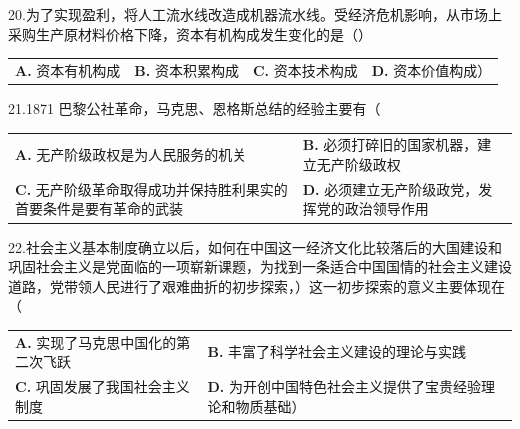 \documentclass[UTF8,11pt]{ctexart}
\begin{document}
20.为了实现盈利，将人工流水线改造成机器流水线。受经济危机影响，从市场上采购生产原材料价格下降，资本有机构成发生变化的是（）


\begin{center}\begin{tabular}{>{\raggedright\arraybackslash}p{\dimexpr(\linewidth-8\tabcolsep)/4\relax}>{\raggedright\arraybackslash}p{\dimexpr(\linewidth-8\tabcolsep)/4\relax}>{\raggedright\arraybackslash}p{\dimexpr(\linewidth-8\tabcolsep)/4\relax}>{\raggedright\arraybackslash}p{\dimexpr(\linewidth-8\tabcolsep)/4\relax}}
\textbf{A.} 资本有机构成 & \textbf{B.} 资本积累构成 & \textbf{C.} 资本技术构成 & \textbf{D.} 资本价值构成）\\[.35em]\end{tabular}\end{center}

21.1871 巴黎公社革命，马克思、恩格斯总结的经验主要有（


\begin{center}\begin{tabular}{>{\raggedright\arraybackslash}p{\dimexpr(\linewidth-4\tabcolsep)/2\relax}>{\raggedright\arraybackslash}p{\dimexpr(\linewidth-4\tabcolsep)/2\relax}}
\textbf{A.} 无产阶级政权是为人民服务的机关 & \textbf{B.} 必须打碎旧的国家机器，建立无产阶级政权\\[.35em]
\textbf{C.} 无产阶级革命取得成功并保持胜利果实的首要条件是要有革命的武装 & \textbf{D.} 必须建立无产阶级政党，发挥党的政治领导作用\\[.35em]\end{tabular}\end{center}

22.社会主义基本制度确立以后，如何在中国这一经济文化比较落后的大国建设和巩固社会主义是党面临的一项崭新课题，为找到一条适合中国国情的社会主义建设道路，党带领人民进行了艰难曲折的初步探索，）这一初步探索的意义主要体现在（


\begin{center}\begin{tabular}{>{\raggedright\arraybackslash}p{\dimexpr(\linewidth-4\tabcolsep)/2\relax}>{\raggedright\arraybackslash}p{\dimexpr(\linewidth-4\tabcolsep)/2\relax}}
\textbf{A.} 实现了马克思中国化的第二次飞跃 & \textbf{B.} 丰富了科学社会主义建设的理论与实践\\[.35em]
\textbf{C.} 巩固发展了我国社会主义制度 & \textbf{D.} 为开创中国特色社会主义提供了宝贵经验理论和物质基础）\\[.35em]\end{tabular}\end{center}
\end{document}
